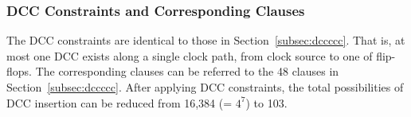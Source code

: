 \subsubsection{DCC Constraints and Corresponding Clauses}
\label{sec:TVA:dcc_c}
The DCC constraints are identical to those in Section~\ref{subsec:dccccc}. That is, at most one DCC exists along a single clock path, from clock source to one of flip-flops. The corresponding clauses can be referred to the 48 clauses in Section~\ref{subsec:dccccc}. After applying DCC constraints, the total possibilities of DCC insertion can be reduced from 16,384 (= $4^7$) to 103. 

